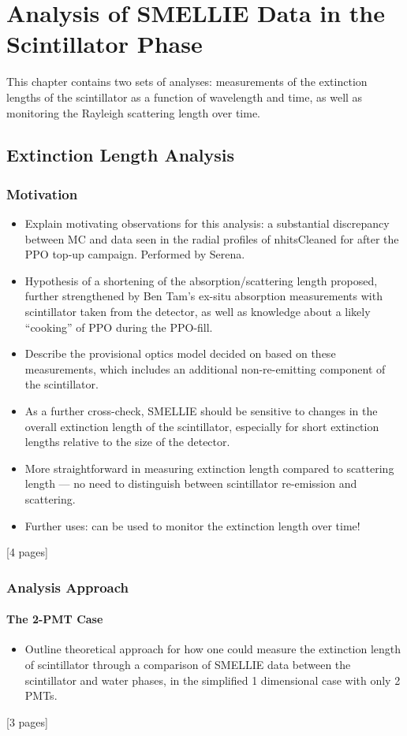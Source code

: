 \chapter{Analysis of SMELLIE Data in the Scintillator Phase}\label{chap:smellie_analysis}
{
    \color{blue}
    This chapter contains two sets of analyses: measurements of the extinction lengths of the scintillator as a function of wavelength and time, as well as monitoring the Rayleigh scattering length over time.

\section{Extinction Length Analysis}
\subsection{Motivation}
\begin{itemize}
    \item Explain motivating observations for this analysis: a substantial discrepancy between MC and data seen in the radial profiles of nhitsCleaned for  after the PPO top-up campaign. Performed by Serena.
    \item Hypothesis of a shortening of the absorption/scattering length proposed, further strengthened by Ben Tam's ex-situ absorption measurements with scintillator taken from the detector, as well as knowledge about a likely ``cooking'' of PPO during the PPO-fill.
    \item Describe the provisional optics model decided on based on these measurements, which includes an additional non-re-emitting component of the scintillator.
    \item As a further cross-check, SMELLIE should be sensitive to changes in the overall extinction length of the scintillator, especially for short extinction lengths relative to the size of the detector.
    \item More straightforward in measuring extinction length compared to scattering length --- no need to distinguish between scintillator re-emission and scattering.
    \item Further uses: can be used to monitor the extinction length over time!
\end{itemize}
[4 pages]
\subsection{Analysis Approach}
\subsubsection{The 2-PMT Case}
\begin{itemize}
    \item Outline theoretical approach for how one could measure the extinction length of scintillator through a comparison of SMELLIE data between the scintillator and water phases, in the simplified 1 dimensional case with only 2 PMTs.
\end{itemize}
[3 pages]

}

